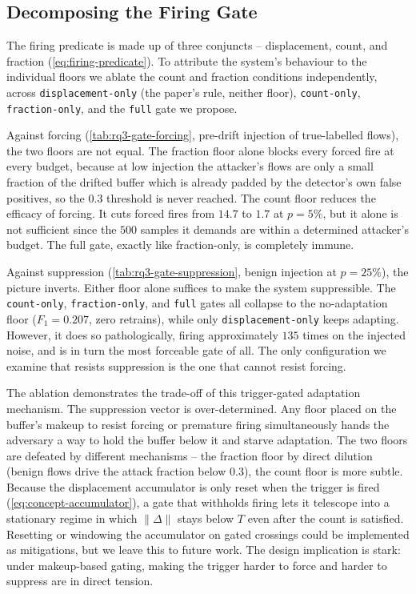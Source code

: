 \subsection{Decomposing the Firing Gate}
\label{sec:eval-rq3-gate}
The firing predicate is made up of three conjuncts -- displacement, count, and fraction (\cref{eq:firing-predicate}). To attribute the system's behaviour to the individual floors we ablate the count and fraction conditions independently, across \texttt{displacement-only} (the paper's rule, neither floor), \texttt{count-only}, \texttt{fraction-only}, and the \texttt{full} gate we propose.





Against forcing (\cref{tab:rq3-gate-forcing}, pre-drift injection of true-labelled flows), the two floors are not equal. The fraction floor alone blocks every forced fire at every budget, because at low injection the attacker's flows are only a small fraction of the drifted buffer which is already padded by the detector's own false positives, so the $0.3$ threshold is never reached. The count floor reduces the efficacy of forcing. It cuts forced fires from $14.7$ to $1.7$ at $p = 5\%$, but it alone is not sufficient since the $500$ samples it demands are within a determined attacker's budget. The full gate, exactly like fraction-only, is completely immune.

Against suppression (\cref{tab:rq3-gate-suppression}, benign injection at $p = 25\%$), the picture inverts. Either floor alone suffices to make the system suppressible. The \texttt{count-only}, \texttt{fraction-only}, and \texttt{full} gates all collapse to the no-adaptation floor ($F_1 = 0.207$, zero retrains), while only \texttt{displacement-only} keeps adapting. However, it does so pathologically, firing approximately $135$ times on the injected noise, and is in turn the most forceable gate of all. The only configuration we examine that resists suppression is the one that cannot resist forcing.

The ablation demonstrates the trade-off of this trigger-gated adaptation mechanism. The suppression vector is over-determined. Any floor placed on the buffer's makeup to resist forcing or premature firing simultaneously hands the adversary a way to hold the buffer below it and starve adaptation. The two floors are defeated by different mechanisms -- the fraction floor by direct dilution (benign flows drive the attack fraction below $0.3$), the count floor is more subtle. Because the displacement accumulator is only reset when the trigger is fired (\cref{eq:concept-accumulator}), a gate that withholds firing lets it telescope into a stationary regime in which $\|\Delta\|$ stays below $T$ even after the count is satisfied. Resetting or windowing the accumulator on gated crossings could be implemented as mitigations, but we leave this to future work. The design implication is stark: under makeup-based gating, making the trigger harder to force and harder to suppress are in direct tension.

